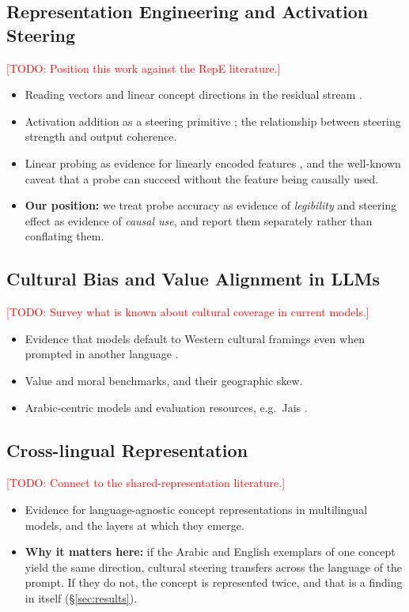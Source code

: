 \documentclass[11pt,a4paper]{article}
\newcommand{\todo}[1]{\textcolor{red}{[TODO: #1]}}
\begin{document}
\subsection{Representation Engineering and Activation Steering}
\todo{Position this work against the RepE literature.}
\begin{itemize}
  \item Reading vectors and linear concept directions in the residual stream
        \citep{zou2023representation}.
  \item Activation addition as a steering primitive
        \citep{turner2023activation}; the relationship between steering
        strength and output coherence.
  \item Linear probing as evidence for linearly encoded features
        \citep{alain2017understanding}, and the well-known caveat that a probe
        can succeed without the feature being causally used.
  \item \textbf{Our position:} we treat probe accuracy as evidence of
        \emph{legibility} and steering effect as evidence of \emph{causal use},
        and report them separately rather than conflating them.
\end{itemize}

\subsection{Cultural Bias and Value Alignment in LLMs}
\todo{Survey what is known about cultural coverage in current models.}
\begin{itemize}
  \item Evidence that models default to Western cultural framings even when
        prompted in another language \citep{naous2024having}.
  \item Value and moral benchmarks, and their geographic skew.
  \item Arabic-centric models and evaluation resources, e.g.\ Jais
        \citep{sengupta2023jais}.
\end{itemize}

\subsection{Cross-lingual Representation}
\todo{Connect to the shared-representation literature.}
\begin{itemize}
  \item Evidence for language-agnostic concept representations in multilingual
        models, and the layers at which they emerge.
  \item \textbf{Why it matters here:} if the Arabic and English exemplars of
        one concept yield the same direction, cultural steering transfers
        across the language of the prompt. If they do not, the concept is
        represented twice, and that is a finding in itself
        (\S\ref{sec:results}).
\end{itemize}
\end{document}
